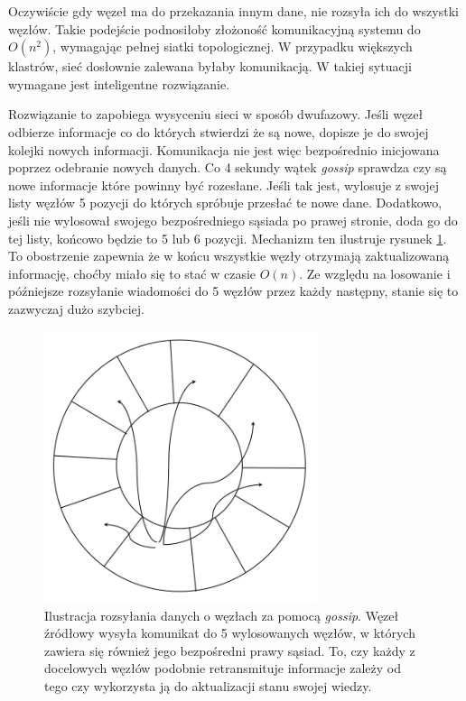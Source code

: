 \documentclass[a4paper,polish,12pt,twoside]{article}
\begin{document}
	Oczywiście gdy węzeł ma do przekazania innym dane, nie rozsyła ich do wszystki węzłów. Takie podejście podnosiłoby złożoność komunikacyjną systemu do $O(n^2)$, wymagając pełnej siatki topologicznej. W przypadku większych klastrów, sieć dosłownie zalewana byłaby komunikacją. W takiej sytuacji wymagane jest inteligentne rozwiązanie.

	Rozwiązanie to zapobiega wysyceniu sieci w sposób dwufazowy. Jeśli węzeł odbierze informacje co do których stwierdzi że są nowe, dopisze je do swojej kolejki nowych informacji. Komunikacja nie jest więc bezpośrednio inicjowana poprzez odebranie nowych danych. Co 4 sekundy wątek \textit{gossip} sprawdza czy są nowe informacje które powinny być rozesłane. Jeśli tak jest, wylosuje z swojej listy węzłów 5 pozycji do których spróbuje przesłać te nowe dane. Dodatkowo, jeśli nie wylosował swojego bezpośredniego sąsiada po prawej stronie, doda go do tej listy, końcowo będzie to 5 lub 6 pozycji. Mechanizm ten ilustruje rysunek \ref{fig:gossip_mirv}. To obostrzenie zapewnia że w końcu wszystkie węzły otrzymają zaktualizowaną informację, choćby miało się to stać w czasie $O(n)$. Ze względu na losowanie i późniejsze rozsyłanie wiadomości do 5 węzłów przez każdy następny, stanie się to zazwyczaj dużo szybciej.

	\begin{figure}[h]
		\centering \includegraphics[width=8cm]{gossip_mirv}
		\caption[Ilustracja rozsyłania danych o węzłach za pomocą \textit{gossip}]{Ilustracja rozsyłania danych o węzłach za pomocą \textit{gossip}. Węzeł źródłowy wysyła komunikat do 5 wylosowanych węzłów, w których zawiera się również jego bezpośredni prawy sąsiad. To, czy każdy z docelowych węzłów podobnie retransmituje informacje zależy od tego czy wykorzysta ją do aktualizacji stanu swojej wiedzy.}
		\label{fig:gossip_mirv}
	\end{figure}
\end{document}
